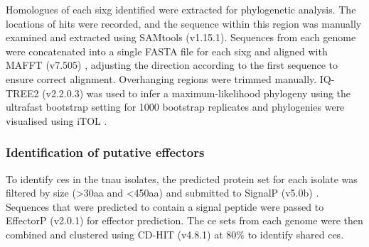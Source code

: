Homologues of each \ac{sixg} identified were extracted for phylogenetic analysis.  The locations of hits were recorded, and the sequence within this region was manually examined and extracted using SAMtools (v1.15.1). Sequences from each genome were concatenated into a single FASTA file for each \ac{sixg} and aligned with  MAFFT (v7.505) \parencite{Katoh2019}, adjusting the direction according to the first sequence to ensure correct alignment. Overhanging regions were trimmed manually. IQ-TREE2 (v2.2.0.3) \parencite{Nguyen2015} was used to infer a maximum-likelihood phylogeny using the ultrafast bootstrap setting for 1000 bootstrap replicates and phylogenies were visualised using iTOL \parencite{Letunic2021}.

\subsubsection{Identification of putative effectors}

To identify \acp{ce} in the \ac{tnau} isolates, the predicted protein set for each isolate was filtered by size (>30aa and <450aa) and submitted to SignalP (v5.0b) \parencite{Petersen2011}. Sequences that were predicted to contain a signal peptide were passed to EffectorP (v2.0.1) \parencite{Sperschneider2018} for effector prediction. The \ac{ce} sets from each genome were then combined and clustered using CD-HIT (v4.8.1) \parencite{Fu2012} at 80\% to identify shared \acp{ce}. 



